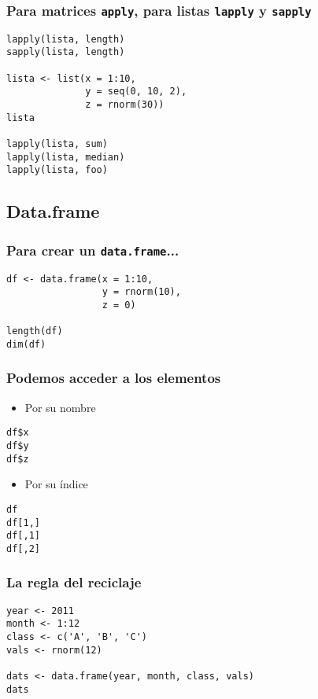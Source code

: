 \documentclass{beamer}
\begin{document}
\begin{frame}[fragile]
\frametitle{Para matrices \texttt{apply}, para listas \texttt{lapply} y \texttt{sapply}}
\label{sec-3-1-4}


\lstset{language=R}
\begin{lstlisting}
lapply(lista, length)
sapply(lista, length)

lista <- list(x = 1:10,
              y = seq(0, 10, 2),
              z = rnorm(30))
lista

lapply(lista, sum)
lapply(lista, median)
lapply(lista, foo)
\end{lstlisting}
\end{frame}
\subsection{Data.frame}
\label{sec-3-2}
\begin{frame}[fragile]
\frametitle{Para crear un \texttt{data.frame}...}
\label{sec-3-2-1}


\lstset{language=R}
\begin{lstlisting}
df <- data.frame(x = 1:10,
                 y = rnorm(10),
                 z = 0)

length(df)
dim(df)
\end{lstlisting}
\end{frame}
\begin{frame}[fragile]
\frametitle{Podemos acceder a los elementos}
\label{sec-3-2-2}

\begin{itemize}
\item Por su nombre
\end{itemize}

\lstset{language=R}
\begin{lstlisting}
df$x
df$y
df$z
\end{lstlisting}

\begin{itemize}
\item Por su índice
\end{itemize}

\lstset{language=R}
\begin{lstlisting}
df
df[1,]
df[,1]
df[,2]
\end{lstlisting}
\end{frame}
\begin{frame}[fragile]
\frametitle{La regla del reciclaje}
\label{sec-3-2-3}


\lstset{language=R}
\begin{lstlisting}
year <- 2011
month <- 1:12
class <- c('A', 'B', 'C')
vals <- rnorm(12)

dats <- data.frame(year, month, class, vals)
dats
\end{lstlisting}
\end{frame}
\end{document}
